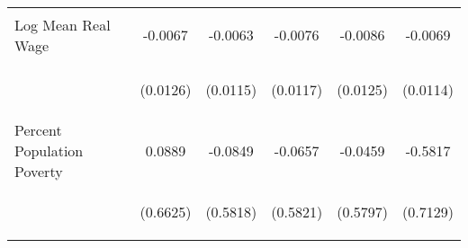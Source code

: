 \begin{center}
\begin{tabular}{lccccc}
\noalign{\smallskip}Log Mean Real Wage & \begin{scriptsize}-0.0067\end{scriptsize} & \begin{scriptsize}-0.0063\end{scriptsize} & \begin{scriptsize}-0.0076\end{scriptsize} & \begin{scriptsize}-0.0086\end{scriptsize} & \begin{scriptsize}-0.0069\end{scriptsize}\\
 & \begin{scriptsize}(0.0126)\end{scriptsize} & \begin{scriptsize}(0.0115)\end{scriptsize} & \begin{scriptsize}(0.0117)\end{scriptsize} & \begin{scriptsize}(0.0125)\end{scriptsize} & \begin{scriptsize}(0.0114)\end{scriptsize}\\
\noalign{\smallskip}Percent Population Poverty & \begin{scriptsize}0.0889\end{scriptsize} & \begin{scriptsize}-0.0849\end{scriptsize} & \begin{scriptsize}-0.0657\end{scriptsize} & \begin{scriptsize}-0.0459\end{scriptsize} & \begin{scriptsize}-0.5817\end{scriptsize}\\
 & \begin{scriptsize}(0.6625)\end{scriptsize} & \begin{scriptsize}(0.5818)\end{scriptsize} & \begin{scriptsize}(0.5821)\end{scriptsize} & \begin{scriptsize}(0.5797)\end{scriptsize} & \begin{scriptsize}(0.7129)\end{scriptsize}\\

\end{tabular}
\end{center}
